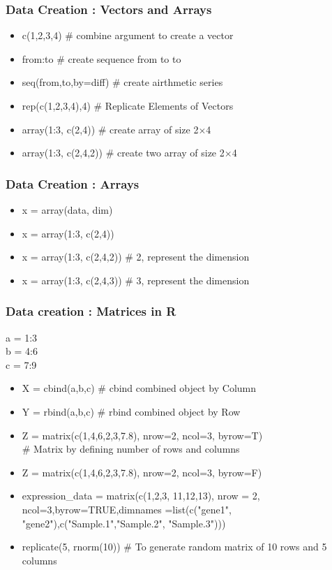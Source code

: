 \documentclass[12pt]{beamer}
\begin{document}
\begin{frame}[fragile]
\frametitle{Data Creation : Vectors and Arrays}
\begin{itemize}\justifying
	\item c(1,2,3,4) \hfill \# combine argument to create a vector
	\item  from:to  \hfill \# create sequence from to to
	\item seq(from,to,by=diff)  \hfill \# create airthmetic series
	\item  rep(c(1,2,3,4),4)  \hfill \# Replicate Elements of Vectors
	\item  array(1:3, c(2,4))  \hfill \# create array of size 2$\times$4
	\item  array(1:3, c(2,4,2))  \hfill \# create two array of size 2$\times$4
\end{itemize}
\end{frame}

\begin{frame}[fragile]
\frametitle{Data Creation : Arrays}
\begin{itemize}\justifying
	\item x = array(data, dim)
	\item x = array(1:3, c(2,4))
	\item x = array(1:3, c(2,4,2))   \hfill \# 2, represent the dimension
	\item x = array(1:3, c(2,4,3))   \hfill \# 3, represent the dimension
\end{itemize}
\end{frame}

\begin{frame}[fragile]
\frametitle{Data creation : Matrices in R}
a = 1:3\\
b = 4:6\\
c = 7:9
\begin{itemize}\justifying
	\item X = cbind(a,b,c) \hfill \# cbind combined object by Column
	\item Y = rbind(a,b,c) \hfill \# rbind combined object by Row
	\item Z = matrix(c(1,4,6,2,3,7.8), nrow=2, ncol=3, byrow=T) \\ \# Matrix by defining number of rows and columns
		\item  Z = matrix(c(1,4,6,2,3,7.8), nrow=2, ncol=3, byrow=F)
		\item  expression\_data = matrix(c(1,2,3, 11,12,13), nrow = 2, ncol=3,byrow=TRUE,dimnames =list(c("gene1", "gene2"),c("Sample.1","Sample.2", "Sample.3")))
		\item  replicate(5, rnorm(10)) \hfill \# To generate random matrix of 10 rows and 5 columns

\end{itemize}
\end{frame}
\end{document}
